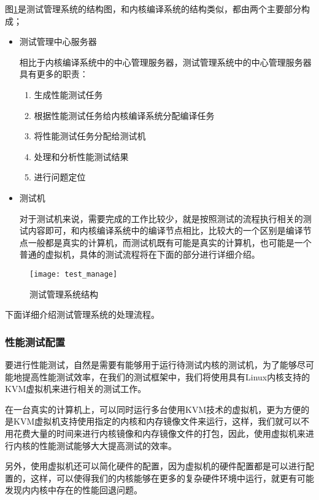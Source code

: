 图\ref{fig:test_manage}是测试管理系统的结构图，和内核编译系统的结构类似，都由两个主要部分构成；
\begin{itemize}
\item 测试管理中心服务器 

相比于内核编译系统中的中心管理服务器，测试管理系统中的中心管理服务器具有更多的职责：

\begin{enumerate}
\item 生成性能测试任务
\item 根据性能测试任务给内核编译系统分配编译任务
\item 将性能测试任务分配给测试机
\item 处理和分析性能测试结果
\item 进行问题定位
\end{enumerate}

\item 测试机

对于测试机来说，需要完成的工作比较少，就是按照测试的流程执行相关的测试内容即可，和内核编译系统中的编译节点相比，比较大的一个区别是编译节点一般都是真实的计算机，而测试机既有可能是真实的计算机，也可能是一个普通的虚拟机，具体的测试流程将在下面的部分进行详细介绍。

\end{itemize}

\begin{figure}[H]
\centering
\texttt{[image: test\_manage]}
\caption{测试管理系统结构}
\label{fig:test_manage}
\end{figure}

下面详细介绍测试管理系统的处理流程。


\subsubsection{性能测试配置}

要进行性能测试，自然是需要有能够用于运行待测试内核的测试机，为了能够尽可能地提高性能测试效率，在我们的测试框架中，我们将使用具有Linux内核支持的KVM虚拟机来进行相关的测试工作。

在一台真实的计算机上，可以同时运行多台使用KVM技术的虚拟机，更为方便的是KVM虚拟机支持使用指定的内核和内存镜像文件来运行，这样，我们就可以不用花费大量的时间来进行内核镜像和内存镜像文件的打包，因此，使用虚拟机来进行内核的性能测试能够大大提高测试的效率。

另外，使用虚拟机还可以简化硬件的配置，因为虚拟机的硬件配置都是可以进行配置的，这样，可以使得我们的内核能够在更多的复杂硬件环境中运行，就更有可能发现内内核中存在的性能回退问题。

